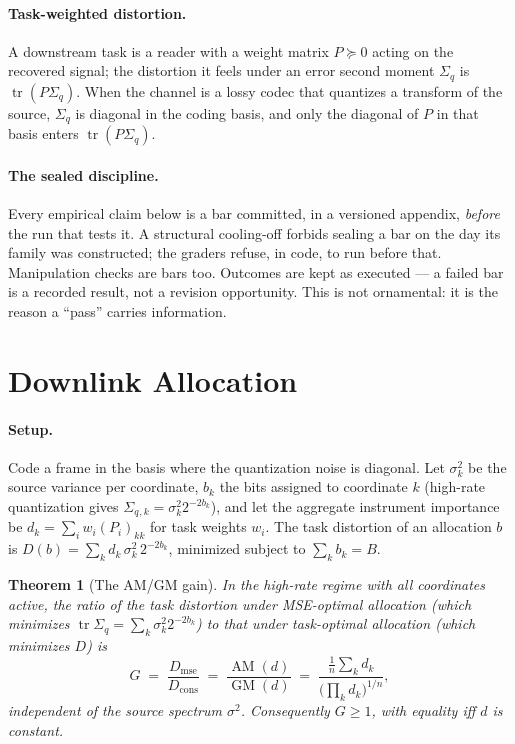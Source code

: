 \documentclass[11pt]{article}
\newtheorem{theorem}{Theorem}
\theoremstyle{definition}
\theoremstyle{remark}
\newcommand{\tr}{\operatorname{tr}}
\newcommand{\AM}{\operatorname{AM}}
\newcommand{\GM}{\operatorname{GM}}
\newcommand{\Sq}{\Sigma_{q}}
\begin{document}
\paragraph{Task-weighted distortion.}
A downstream task is a reader with a weight matrix $P\succeq 0$ acting on the
recovered signal; the distortion it feels under an error second moment
$\Sq$ is $\tr(P\Sq)$. When the channel is a lossy codec that quantizes a
transform of the source, $\Sq$ is diagonal in the coding basis, and only
the diagonal of $P$ in that basis enters $\tr(P\Sq)$.

\paragraph{The sealed discipline.}
Every empirical claim below is a bar committed, in a versioned appendix,
\emph{before} the run that tests it. A structural cooling-off forbids
sealing a bar on the day its family was constructed; the graders refuse,
in code, to run before that. Manipulation checks are bars too. Outcomes
are kept as executed --- a failed bar is a recorded result, not a
revision opportunity. This is not ornamental: it is the reason a ``pass''
carries information.

\section{Downlink Allocation}
\label{sec:sc1}

\paragraph{Setup.}
Code a frame in the basis where the quantization noise is diagonal. Let
$\sigma_k^2$ be the source variance per coordinate, $b_k$ the bits
assigned to coordinate $k$ (high-rate quantization gives
$\Sq{}_{,k}=\sigma_k^2 2^{-2b_k}$), and let the aggregate instrument
importance be $d_k=\sum_i w_i (P_i)_{kk}$ for task weights $w_i$. The
task distortion of an allocation $b$ is
$D(b)=\sum_k d_k\,\sigma_k^2\,2^{-2b_k}$, minimized subject to
$\sum_k b_k=B$.

\begin{theorem}[The AM/GM gain]
\label{thm:amgm}
In the high-rate regime with all coordinates active, the ratio of the
task distortion under MSE-optimal allocation (which minimizes
$\tr\Sq=\sum_k\sigma_k^2 2^{-2b_k}$) to that under task-optimal
allocation (which minimizes $D$) is
\[
  G \;=\; \frac{D_{\mathrm{mse}}}{D_{\mathrm{cons}}}
    \;=\; \frac{\AM(d)}{\GM(d)}
    \;=\; \frac{\tfrac1n\sum_k d_k}{\big(\prod_k d_k\big)^{1/n}},
\]
independent of the source spectrum $\sigma^2$. Consequently $G\ge 1$, with
equality iff $d$ is constant.
\end{theorem}
\end{document}
